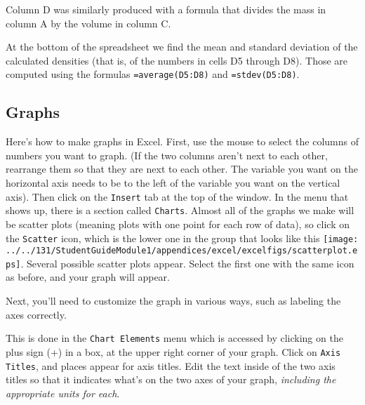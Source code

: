 Column D was similarly produced with a formula that divides the
mass in column A by the volume in column C.

At the bottom of the spreadsheet we find the mean and standard
deviation of the calculated densities (that is, of the numbers
in cells D5 through D8).  Those are computed
using the formulas {\tt =average(D5:D8)} and {\tt =stdev(D5:D8)}.




\subsection{Graphs}

Here's how to make graphs in Excel.  First, use the mouse
to select the columns of numbers you want to graph.  (If the two
columns aren't next to each other, rearrange them so that they are next to 
each other. The variable you want on the horizontal axis needs to be to the 
left of the variable you want on the vertical axis).
Then click on the {\tt Insert} tab at the top of the window.
In the menu that shows up, there is a section called {\tt Charts}.
Almost all of the graphs we make will be scatter plots (meaning plots
with one point for each row of data), so click on the {\tt Scatter} icon, 
which is the lower one in the group that looks like this  
\texttt{[image: ../../131/StudentGuideModule1/appendices/excel/excelfigs/scatterplot.eps]}.  
Several possible scatter plots appear. Select the 
first one with the same icon as before, and your graph will appear.
\vspace{0.5cm}

Next, you'll need to customize the graph in various ways, such
as labeling the axes correctly.  
\vspace{0.5cm}

This is done in the {\tt Chart Elements} menu which is accessed by clicking 
on the plus sign (+) in a box, at the upper right corner of your graph. Click 
on {\tt Axis Titles}, and places appear for axis titles. Edit the text inside 
of the two axis titles so that it indicates what's on the two axes of your 
graph, {\it including the appropriate units for each}.
\vspace{0.5cm}

